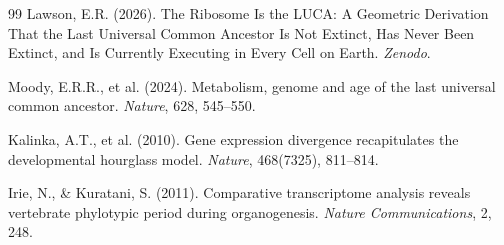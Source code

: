 \documentclass[12pt, a4paper]{article}
\theoremstyle{definition}
\theoremstyle{remark}
\begin{document}
\begin{thebibliography}{99}
Lawson, E.R. (2026).
The Ribosome Is the LUCA: A Geometric Derivation
That the Last Universal Common Ancestor Is Not
Extinct, Has Never Been Extinct, and Is Currently
Executing in Every Cell on Earth.
\textit{Zenodo}.

Moody, E.R.R., et al. (2024).
Metabolism, genome and age of the last universal
common ancestor.
\textit{Nature}, 628, 545--550.

Kalinka, A.T., et al. (2010).
Gene expression divergence recapitulates the
developmental hourglass model.
\textit{Nature}, 468(7325), 811--814.

Irie, N., \& Kuratani, S. (2011).
Comparative transcriptome analysis reveals vertebrate
phylotypic period during organogenesis.
\textit{Nature Communications}, 2, 248.

\end{thebibliography}
\end{document}
